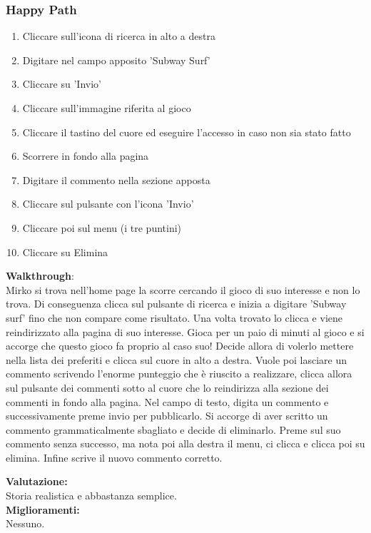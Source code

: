\documentclass[../Report.tex]{subfiles}
\begin{document}
    \subsubsection{Happy Path}
\begin{enumerate}
    \item Cliccare sull'icona di ricerca in alto a destra
    \item Digitare nel campo apposito 'Subway Surf'
    \item Cliccare su 'Invio'
    \item Cliccare sull'immagine riferita al gioco
    \item Cliccare il tastino del cuore ed eseguire l'accesso in caso non sia stato fatto
    \item Scorrere in fondo alla pagina
    \item Digitare il commento nella sezione apposta
    \item Cliccare sul pulsante con l'icona 'Invio'
    \item Cliccare poi sul menu (i tre puntini)
    \item Cliccare su Elimina 
\end{enumerate}
\textbf{Walkthrough}:\\
    Mirko si trova nell'home page la scorre cercando il gioco di suo interesse e non lo trova.
    Di conseguenza clicca sul pulsante di ricerca e inizia a digitare 'Subway surf' fino che non compare come risultato.
    Una volta trovato lo clicca e viene reindirizzato alla pagina di suo interesse.
    Gioca per un paio di minuti al gioco e si accorge che questo gioco fa proprio al caso suo! Decide allora di volerlo mettere nella lista dei preferiti e clicca sul cuore in alto a destra. Vuole poi lasciare un commento scrivendo l'enorme punteggio che è riuscito a realizzare, clicca allora sul pulsante dei commenti sotto al cuore che lo reindirizza alla sezione dei commenti in fondo alla pagina.
    Nel campo di testo, digita un commento e successivamente preme invio per pubblicarlo. Si accorge di aver scritto un commento grammaticalmente sbagliato e decide di eliminarlo. Preme sul suo commento senza successo, ma nota poi alla destra il menu, ci clicca e clicca poi su elimina. Infine scrive il nuovo commento corretto. 

    \textbf{Valutazione:}\\Storia  realistica e abbastanza semplice.\\

    \textbf{Miglioramenti:}\\Nessuno.
\end{document}
